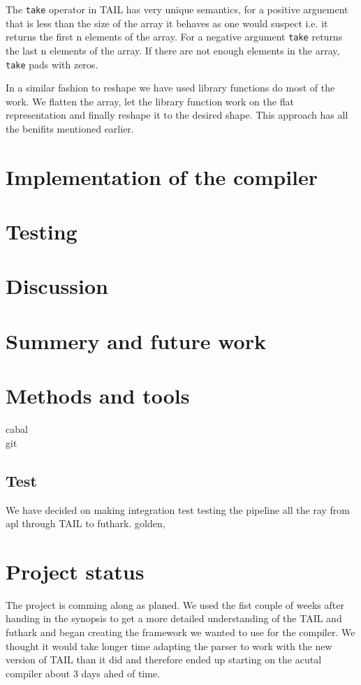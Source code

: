 \documentclass[11pt]{article}
\begin{document}
The {\tt take} operator in TAIL has very unique semantics, for a positive arguement that is less than the size of the array it behaves as one would suspect i.e. it returns the first n elements of the array. For a negative argument {\tt take} returns the last n elements of the array. If there are not enough elements in the array, {\tt take} pads with zeros.

In a similar fashion to reshape we have used library functions do most of the work.
We flatten the array, let the library function work on the flat representation and finally reshape it to the desired shape.
This approach has all the benifits mentioned earlier.

\section{Implementation of the compiler}

\section{Testing}

\section{Discussion}

\section{Summery and future work}

\section{Methods and tools}

cabal\\
git\\
\subsection{Test}
We have decided on making integration test testing the pipeline all the ray from apl through TAIL to futhark.
golden, \\

\section{Project status}
The project is comming along as planed. We used the fist couple of weeks after handing in the synopsis to get a more detailed understanding of the TAIL and futhark and began creating the framework we wanted to use for the compiler. 
We thought it would take longer time adapting the parser to work with the new version of TAIL than it did and therefore ended up starting on the acutal compiler about 3 days ahed of time. 
\end{document}
